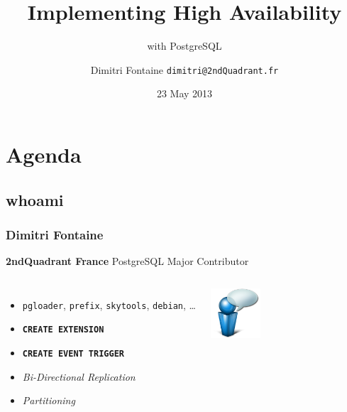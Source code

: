 \documentclass[english]{beamer}
\title{Implementing High Availability}
\subtitle{with PostgreSQL}
\author{Dimitri Fontaine \newline\tiny{\texttt{dimitri@2ndQuadrant.fr}}}
\date{23 May 2013}
\begin{document}
\frame{\titlepage}

\section{Agenda}
\subsection{whoami}
\frame{\tableofcontents[currentsection]}

\begin{frame}[fragile]
  \frametitle{Dimitri Fontaine}

  \begin{center}
    \textbf{2ndQuadrant France}
    \linebreak
    PostgreSQL Major Contributor
  \end{center}
  \linebreak

\begin{columns}[c]

  \begin{itemize}
   \item<1-> \texttt{pgloader}, \texttt{prefix}, \texttt{skytools}, \texttt{debian}, …
   \item<1-> \texttt{\textbf{CREATE EXTENSION}}
   \item<2-> \texttt{\textbf{CREATE EVENT TRIGGER}}
   \item<2-> \textit{Bi-Directional Replication}
   \item<3-> \textit{Partitioning}
  \end{itemize}  

\begin{center}
  \includegraphics[height=5em]{bulle-blue-icon.png}
\end{center}
\end{columns}
\end{frame}
\end{document}
